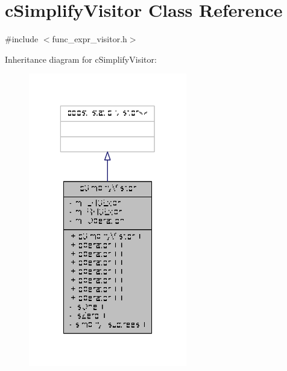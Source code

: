 \hypertarget{classcSimplifyVisitor}{\section{c\-Simplify\-Visitor Class Reference}
\label{classcSimplifyVisitor}
}


{\ttfamily \#include $<$func\-\_\-expr\-\_\-visitor.\-h$>$}



Inheritance diagram for c\-Simplify\-Visitor\-:
\nopagebreak
\begin{figure}[H]
\begin{center}
\leavevmode
\includegraphics[width=196pt]{classcSimplifyVisitor__inherit__graph}
\end{center}
\end{figure}


